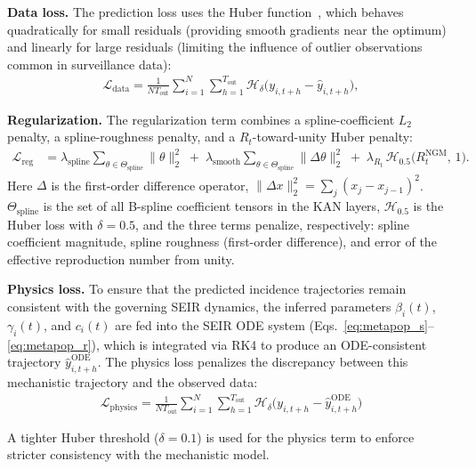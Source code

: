 \documentclass[10pt,letterpaper]{article}
\begin{document}
	\noindent\textbf{Data loss.}
	The prediction loss uses the Huber function~\cite{bishop2006}, which behaves
	quadratically for small residuals (providing smooth gradients near the optimum)
	and linearly for large residuals (limiting the influence of outlier observations
	common in surveillance data):
	\begin{align*}
		\mathcal{L}_{\mathrm{data}}
		= \frac{1}{N T_{\mathrm{out}}}
		\sum_{i=1}^{N} \sum_{h=1}^{T_{\mathrm{out}}}
		\mathcal{H}_{\delta}\!\bigl(y_{i,t+h} - \hat{y}_{i,t+h}\bigr),
	\end{align*}
	
	\noindent\textbf{Regularization.}
	The regularization term combines a spline-coefficient $L_2$ penalty, a
	spline-roughness penalty, and a $R_t$-toward-unity Huber penalty:
	\begin{align*}
		\mathcal{L}_{\mathrm{reg}}
		&=
		\lambda_{\mathrm{spline}}\!\sum_{\theta\in\Theta_{\mathrm{spline}}}\!\|\theta\|_{2}^{2}
		\;+\;
		\lambda_{\mathrm{smooth}}\!\sum_{\theta\in\Theta_{\mathrm{spline}}}\!\|\Delta\theta\|_{2}^{2}
		\;+\;
		\lambda_{R_t}\,\mathcal{H}_{0.5}\!\bigl(R_t^{\mathrm{NGM}},\,1\bigr).
	\end{align*}
	Here $\Delta$ is the first-order difference operator,
	$\|\Delta x\|_2^2 = \sum_j (x_j - x_{j-1})^2$.
	$\Theta_{\mathrm{spline}}$ is the set of all B-spline
	coefficient tensors in the KAN layers, $\mathcal{H}_{0.5}$ is the Huber
	loss with $\delta = 0.5$, and the three terms
	penalize, respectively: spline coefficient magnitude, spline roughness
	(first-order difference), and error of the effective reproduction
	number from unity.
	
	
	\noindent\textbf{Physics loss.}
	To ensure that the predicted incidence trajectories remain consistent with the
	governing SEIR dynamics, the inferred parameters $\beta_i(t)$, $\gamma_i(t)$, and
	$c_i(t)$ are fed into the SEIR ODE system (Eqs.~\ref{eq:metapop_s}--\ref{eq:metapop_r}),
	which is integrated via RK4 to produce an ODE-consistent trajectory $\hat{y}^{\mathrm{ODE}}_{i,t+h}$.
	The physics loss penalizes the discrepancy between this mechanistic trajectory and
	the observed data:
	\begin{align*}
		\mathcal{L}_{\mathrm{physics}}
		=
		\frac{1}{N T_{\mathrm{out}}}
		\sum_{i=1}^{N} \sum_{h=1}^{T_{\mathrm{out}}}
		\mathcal{H}_{\delta}\!\bigl(y_{i,t+h} - \hat{y}^{\mathrm{ODE}}_{i,t+h}\bigr)
	\end{align*}
	
	\noindent A tighter Huber threshold ($\delta = 0.1$) is used for the physics term
	to enforce stricter consistency with the mechanistic model.
	
\end{document}
